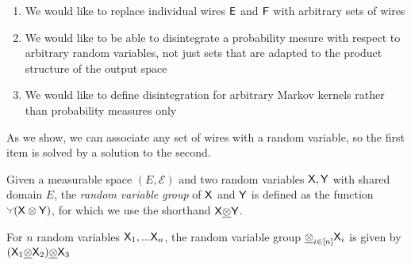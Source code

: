 \begin{enumerate}
\item We would like to replace individual wires $\mathsf{E}$ and $\mathsf{F}$ with arbitrary sets of wires
\item We would like to be able to disintegrate a probability mesure with respect to arbitrary random variables, not just sets that are adapted to the product structure of the output space
\item We would like to define disintegration for arbitrary Markov kernels rather than probability measures only
\end{enumerate}

As we show, we can associate any set of wires with a random variable, so the first item is solved by a solution to the second. 

\begin{definition}
Given a measurable space $(E,\mathcal{E})$ and two random variables $\mathsf{X},\mathsf{Y}$ with shared domain $E$, the \emph{random variable group} of $\mathsf{X}$ and $\mathsf{Y}$ is defined as the function $\splitter{0.1}(\RV{X}\otimes\RV{Y})$, for which we use the shorthand $\mathsf{X}\underline{\otimes}\mathsf{Y}$. 

For $n$ random variables $\mathsf{X}_1,...\mathsf{X}_n$, the random variable group $\underline{\otimes}_{i\in[n]} \mathsf{X}_i$ is given by $(\mathsf{X}_1\underline{\otimes}\mathsf{X}_2)\underline{\otimes}\mathsf{X}_3$ 
\end{definition}

\begin{lemma}

\end{lemma}


